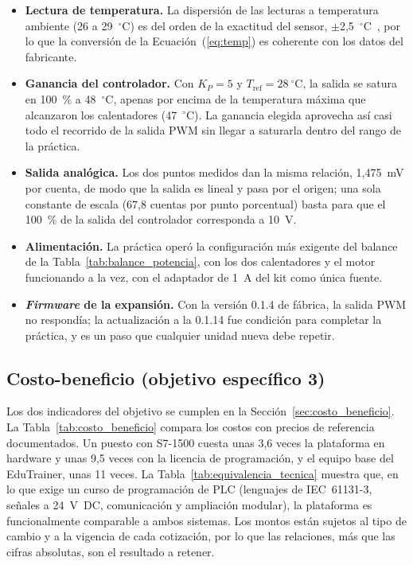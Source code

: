 \documentclass[12pt,a4paper,oneside]{report}
\begin{document}
\begin{itemize}
    \item \textbf{Lectura de temperatura.} La dispersión de las lecturas a temperatura ambiente (26 a 29~$^\circ$C) es del orden de la exactitud del sensor, $\pm$2,5~$^\circ$C~\cite{ref37}, por lo que la conversión de la Ecuación~(\ref{eq:temp}) es coherente con los datos del fabricante.
    \item \textbf{Ganancia del controlador.} Con $K_P = 5$ y $T_{\mathrm{ref}} = 28~^\circ$C, la salida se satura en 100~\% a 48~$^\circ$C, apenas por encima de la temperatura máxima que alcanzaron los calentadores (47~$^\circ$C). La ganancia elegida aprovecha así casi todo el recorrido de la salida PWM sin llegar a saturarla dentro del rango de la práctica.
    \item \textbf{Salida analógica.} Los dos puntos medidos dan la misma relación, 1,475~mV por cuenta, de modo que la salida es lineal y pasa por el origen; una sola constante de escala (67,8 cuentas por punto porcentual) basta para que el 100~\% de la salida del controlador corresponda a 10~V.
    \item \textbf{Alimentación.} La práctica operó la configuración más exigente del balance de la Tabla~\ref{tab:balance_potencia}, con los dos calentadores y el motor funcionando a la vez, con el adaptador de 1~A del kit como única fuente.
    \item \textbf{\emph{Firmware} de la expansión.} Con la versión 0.1.4 de fábrica, la salida PWM no respondía; la actualización a la 0.1.14 fue condición para completar la práctica, y es un paso que cualquier unidad nueva debe repetir.
\end{itemize}

\subsection{Costo-beneficio (objetivo específico 3)}

Los dos indicadores del objetivo se cumplen en la Sección~\ref{sec:costo_beneficio}. La Tabla~\ref{tab:costo_beneficio} compara los costos con precios de referencia documentados. Un puesto con S7-1500 cuesta unas 3,6 veces la plataforma en hardware y unas 9,5 veces con la licencia de programación, y el equipo base del EduTrainer, unas 11 veces. La Tabla~\ref{tab:equivalencia_tecnica} muestra que, en lo que exige un curso de programación de PLC (lenguajes de IEC~61131-3, señales a 24~V~DC, comunicación y ampliación modular), la plataforma es funcionalmente comparable a ambos sistemas. Los montos están sujetos al tipo de cambio y a la vigencia de cada cotización, por lo que las relaciones, más que las cifras absolutas, son el resultado a retener.
\end{document}
